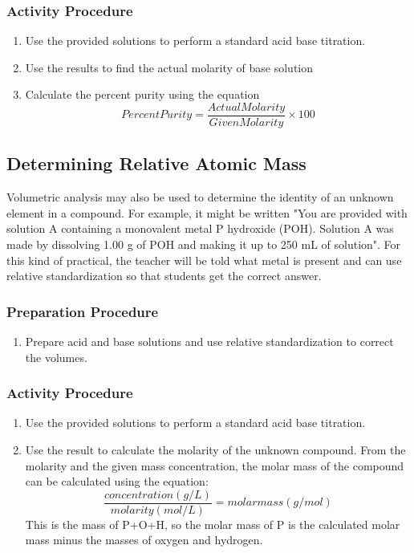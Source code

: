 \subsubsection{Activity Procedure}
\begin{enumerate}
\item {Use the provided solutions to perform a standard acid base titration.}
\item{Use the results to find the actual molarity of base solution}
\item {Calculate the percent purity using the equation
$$Percent Purity = \frac{Actual  Molarity}{Given  Molarity}\times 100$$}
\end{enumerate}


\subsection{Determining Relative Atomic Mass}

Volumetric analysis may also be used to determine the identity of an unknown element in a compound. For example, it might be written "You are provided with solution A containing a monovalent metal P hydroxide (POH). Solution A was made by dissolving 1.00 g of POH and making it up to 250 mL of solution". For this kind of practical, the teacher will be told what metal is present and can use relative standardization so that students get the correct answer.

\subsubsection{Preparation Procedure}
\begin{enumerate}
\item{Prepare acid and base solutions and use relative standardization to correct the volumes.}
\end{enumerate}
\subsubsection{Activity Procedure}
\begin{enumerate}
\item{Use the provided solutions to perform a standard acid base titration.}
\item{Use the result to calculate the molarity of the unknown compound. From the molarity and the given mass concentration, the molar mass of the compound can be calculated using the equation: 
$$\frac{concentration(g/L)}{molarity(mol/L)}={molar mass(g/mol)}$$
This is the mass of P+O+H, so the molar mass of P is the calculated molar mass minus the masses of oxygen and hydrogen.}
\end{enumerate}


